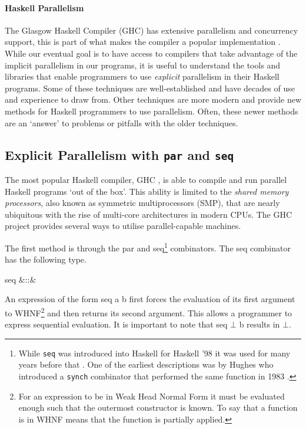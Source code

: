 \paragraph{Haskell Parallelism}

The Glasgow Haskell Compiler (GHC) has extensive parallelism and concurrency
support, this is part of what makes the compiler a popular implementation
\citep{HistoryOfHaskell}. While our eventual goal is to have access to
compilers that take advantage of the implicit parallelism in our programs, it
is useful to understand the tools and libraries that enable programmers to use
\emph{explicit} parallelism in their Haskell programs. Some of these techniques
are well-established and have decades of use and experience to draw from. Other
techniques are more modern and provide new methods for Haskell programmers to
use parallelism. Often, these newer methods are an `answer' to problems or
pitfalls with the older techniques.

\subsection{Explicit Parallelism with \texttt{par} and \texttt{seq}}

The most popular Haskell compiler, GHC \citep{HistoryOfHaskell}, is able to
compile and run parallel Haskell programs `out of the box'. This ability is
limited to the \emph{shared memory processors}, also known as symmetric
multiprocessors (SMP), that are nearly ubiquitous with the rise of multi-core
architectures in modern CPUs. The GHC project provides several ways to utilise
parallel-capable machines.

The first method is through the \<par\> and \<seq\>\footnote{While
\texttt{seq} was introduced into Haskell for Haskell '98 \citep{Haskell98Book}
it was used for many years before that \citep{HistoryOfHaskell}. One of the
earliest descriptions was by Hughes who introduced a \texttt{synch} combinator
that performed the same function in 1983 \citep{hughes:thesis}.} combinators.
The \<seq\> combinator has the following type.

\begin{haskell}
seq &::& \hasalpha \to \hasbeta \to \hasbeta
\end{haskell}

An expression of the form \<seq a b\> first forces the evaluation of its
first argument to WHNF\footnote{For an expression to be in Weak Head Normal
Form it must be evaluated enough such that the outermost constructor is known.
To say that a function is in WHNF means that the function is partially
applied.} and then returns its second argument. This allows a programmer to
express sequential evaluation. It is important to note that \<seq\> $\bot$
\<b\> results in $\bot$.

